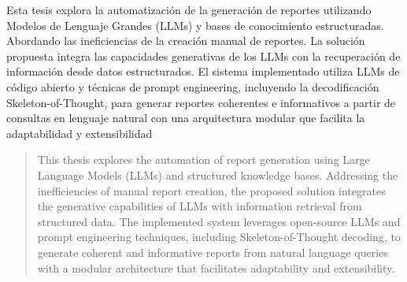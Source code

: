 \begin{resumen}
	Esta tesis explora la automatización de la generación de reportes utilizando Modelos de Lenguaje Grandes (LLMs) y bases de conocimiento estructuradas. Abordando las ineficiencias de la creación manual de reportes. La solución propuesta integra las capacidades generativas de los LLMs con la recuperación de información desde datos estructurados. El sistema implementado utiliza LLMs de código abierto y técnicas de prompt engineering, incluyendo la decodificación Skeleton-of-Thought, para generar reportes coherentes e informativos a partir de consultas en lenguaje natural con una arquitectura modular que facilita la adaptabilidad y extensibilidad
\end{resumen}

\begin{abstract}
	This thesis explores the automation of report generation using Large Language Models (LLMs) and structured knowledge bases. Addressing the inefficiencies of manual report creation, the proposed solution integrates the generative capabilities of LLMs with information retrieval from structured data. The implemented system leverages open-source LLMs and prompt engineering techniques, including Skeleton-of-Thought decoding, to generate coherent and informative reports from natural language queries with a modular architecture that facilitates adaptability and extensibility.
\end{abstract}